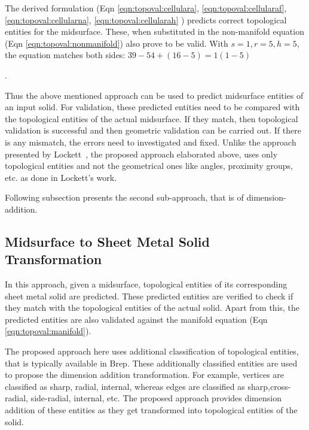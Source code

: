 The derived formulation (Eqn   \ref{eqn:topoval:cellulara}, \ref{eqn:topoval:cellularaf}, \ref{eqn:topoval:cellularna}, \ref{eqn:topoval:cellularah} ) predicts correct topological entities for the midsurface. These, when substituted in the non-manifold equation (Eqn \ref{eqn:topoval:nonmanifold}) also prove to be valid. With $s=1, r=5, h=5$, the equation matches both sides:
$ 39 - 54 + (16 -5) = 1 (1-5)$

.

Thus the above mentioned approach can be used to predict midsurface entities of an input solid. For validation, these predicted entities need to be compared with the topological entities of the actual midsurface. If they match, then topological validation is successful and then geometric validation can be carried out. If there is any mismatch, the errors need to investigated and fixed. Unlike the approach presented by Lockett~\cite{Lockett2008}, the proposed approach elaborated above, uses only topological entities and not the geometrical ones like angles, proximity groups, etc. as done in Lockett's work.

Following subsection presents the second sub-approach, that is of dimension-addition.

\subsection{Midsurface to Sheet Metal Solid Transformation} \label{sec:topoval:surfsolid}
In this approach, given a midsurface, topological entities  of its corresponding sheet metal solid are predicted. These predicted entities are verified to check if they match with the topological entities of the actual solid. Apart from this, the predicted entities are also validated against the manifold equation (Eqn \ref{eqn:topoval:manifold}). 

The proposed approach here uses additional classification of topological entities, that is typically available in Brep. These additionally classified entities are used to propose the dimension addition transformation. For example, vertices are classified as sharp, radial, internal, whereas edges are classified as sharp,cross-radial, side-radial, internal, etc. The proposed approach provides dimension addition of these entities as they get transformed into topological entities of the solid. 


